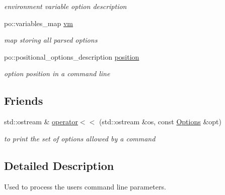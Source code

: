 \begin{DoxyCompactItemize}
\begin{DoxyCompactList}\small\item\em environment variable option description \item\end{DoxyCompactList}\item 
\hypertarget{classOptions_abc7f4ca9d2c7a913ba456b8860801252}{
po::variables\_\-map \hyperlink{classOptions_abc7f4ca9d2c7a913ba456b8860801252}{vm}}
\label{classOptions_abc7f4ca9d2c7a913ba456b8860801252}

\begin{DoxyCompactList}\small\item\em map storing all parsed options \item\end{DoxyCompactList}\item 
\hypertarget{classOptions_af8b2b8d849ff496114482cc91e46bc3d}{
po::positional\_\-options\_\-description \hyperlink{classOptions_af8b2b8d849ff496114482cc91e46bc3d}{position}}
\label{classOptions_af8b2b8d849ff496114482cc91e46bc3d}

\begin{DoxyCompactList}\small\item\em option position in a command line \item\end{DoxyCompactList}\end{DoxyCompactItemize}
\subsection*{Friends}
\begin{DoxyCompactItemize}
\item 
std::ostream \& \hyperlink{classOptions_ae15f68171e057fc044838a8b66a029a0}{operator$<$$<$} (std::ostream \&os, const \hyperlink{classOptions}{Options} \&opt)
\begin{DoxyCompactList}\small\item\em to print the set of options allowed by a command \item\end{DoxyCompactList}\end{DoxyCompactItemize}


\subsection{Detailed Description}
Used to process the users command line parameters. 

